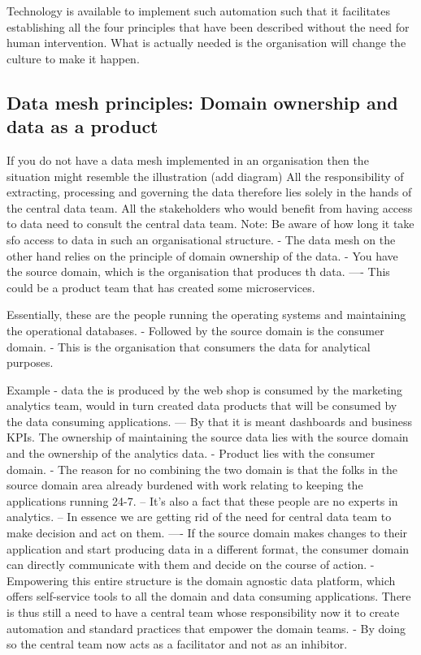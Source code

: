 \documentclass[a4paper, 11pt]{article}
\begin{document}
    Technology is available to implement such automation such that it facilitates establishing all the four principles that have been described without the need for human intervention.
    What is actually needed is the organisation will change the culture to make it happen.

    \subsection{Data mesh principles: Domain ownership and data as a product}
    If you do not have a data mesh implemented in an organisation then the situation might resemble the illustration (add diagram)
    All the responsibility of extracting, processing and governing the data therefore lies solely in the hands of the central data team.
    All the stakeholders who would benefit from having access to data need to consult the central data team.
    Note: Be aware of how long it take sfo access to data in such an organisational structure.
    - The data mesh on the other hand relies on the principle of domain ownership of the data.
    - You have the source domain, which is the organisation that produces th data.
    ---- This could be a product team that has created some microservices.

    Essentially, these are the people running the operating systems and maintaining the operational databases.
    - Followed by the source domain is the consumer domain.
    - This is the organisation that consumers the data for analytical purposes.

    Example - data the is produced by the web shop is consumed by the marketing analytics team, would in turn created data products that will be consumed by the data consuming applications.
    --- By that it is meant dashboards and business KPIs.
    The ownership of maintaining the source data lies with the source domain and the ownership of the analytics data.
    - Product lies with the consumer domain.
    - The reason for no combining the two domain is that the folks in the source domain area already burdened with work relating to keeping the applications running 24-7.
    -- It's also a fact that these people are no experts in analytics.
    -- In essence we are getting rid of the need for central data team to make decision and act on them.
    ---- If the source domain makes changes to their application and start producing data in a different format, the consumer domain can directly communicate with them and decide on the course of action.
    - Empowering this entire structure is the domain agnostic data platform, which offers self-service tools to all the domain and data consuming applications.
    There is thus still a need to have a central team whose responsibility now it to create automation and standard practices that empower the domain teams.
    - By doing so the central team now acts as a facilitator and not as an inhibitor.
\end{document}
